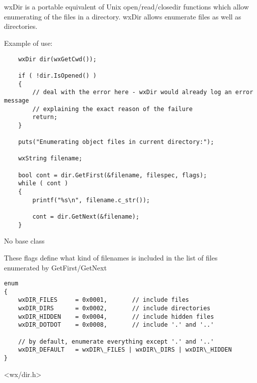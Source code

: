 %
%


\section{}\label{wxdir}

wxDir is a portable equivalent of Unix {open/read/close}dir functions which
allow enumerating of the files in a directory. wxDir allows enumerate files as
well as directories.

Example of use:

\begin{verbatim}
    wxDir dir(wxGetCwd());

    if ( !dir.IsOpened() )
    {
        // deal with the error here - wxDir would already log an error message
        // explaining the exact reason of the failure
        return;
    }

    puts("Enumerating object files in current directory:");

    wxString filename;

    bool cont = dir.GetFirst(&filename, filespec, flags);
    while ( cont )
    {
        printf("%s\n", filename.c_str());

        cont = dir.GetNext(&filename);
    }
\end{verbatim}


No base class


These flags define what kind of filenames is included in the list of files
enumerated by GetFirst/GetNext

{\small
\begin{verbatim}
enum
{
    wxDIR_FILES     = 0x0001,       // include files
    wxDIR_DIRS      = 0x0002,       // include directories
    wxDIR_HIDDEN    = 0x0004,       // include hidden files
    wxDIR_DOTDOT    = 0x0008,       // include '.' and '..'

    // by default, enumerate everything except '.' and '..'
    wxDIR_DEFAULT   = wxDIR\_FILES | wxDIR\_DIRS | wxDIR\_HIDDEN
}
\end{verbatim}
}


<wx/dir.h>


\label{wxdirexists}

